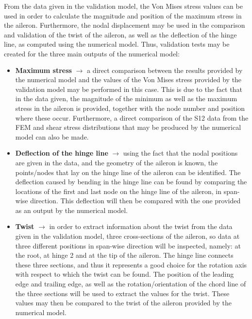 \noindent From the data given in the validation model, the Von Mises stress values can be used in order to calculate the magnitude and position of the maximum stress in the aileron. Furthermore, the nodal displacement may be used in the comparison and validation of the twist of the aileron, as well as the deflection of the hinge line, as computed using the numerical model. Thus, validation tests may be created for the three main outputs of the numerical model: 
\begin{itemize}
    \item \textbf{Maximum stress} $\rightarrow$ a direct comparison between the results provided by the numerical model and the values of the Von Mises stress provided by the validation model may be performed in this case. This is due to the fact that in the data given, the magnitude of the minimum as well as the maximum stress in the aileron is provided, together with the node number and position where these occur. Furthermore, a direct comparison of the S12 data from the FEM and shear stress distributions that may be produced by the numerical model can also be made. 
    
    \item \textbf{Deflection of the hinge line} $\rightarrow$ using the fact that the nodal positions are given in the data, and the geometry of the aileron is known, the points/nodes that lay on the hinge line of the aileron can be identified. The deflection caused by bending in the hinge line can be found by comparing the locations of the first and last node on the hinge line of the aileron, in span-wise direction. This deflection will then be compared with the one provided as an output by the numerical model.
    
    \item \textbf{Twist} $\rightarrow$ in order to extract information about the twist from the data given in the validation model, three cross-sections of the aileron, so data at three different positions in span-wise direction will be inspected, namely: at the root, at hinge 2 and at the tip of the aileron. The hinge line connects these three sections, and thus it represents a good choice for the rotation axis with respect to which the twist can be found. The position of the leading edge and trailing edge, as well as the rotation/orientation of the chord line of the three sections will be used to extract the values for the twist. These values may then be compared to the twist of the aileron provided by the numerical model.  
    
\end{itemize}

